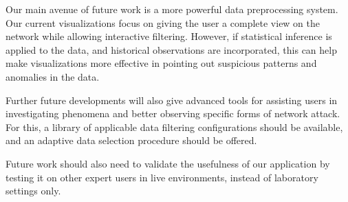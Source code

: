 Our main avenue of future work is a more powerful data preprocessing system. Our current visualizations focus on giving the user a complete view on the network while allowing interactive filtering. However, if statistical inference is applied to the data, and historical observations are incorporated, this can help make visualizations more effective in pointing out suspicious patterns and anomalies in the data.

Further future developments will also give advanced tools for assisting users in investigating phenomena and better observing specific forms of network attack. For this, a library of applicable data filtering configurations should be available, and an adaptive data selection procedure should be offered.

Future work should also need to validate the usefulness of our application by testing it on other expert users in live environments, instead of laboratory settings only.
